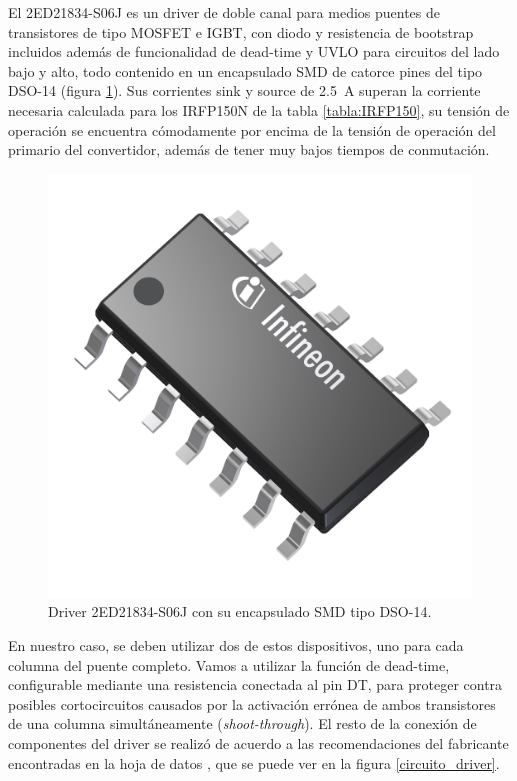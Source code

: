 El 2ED21834-S06J es un driver de doble canal para medios puentes de transistores de tipo MOSFET e IGBT, con diodo y resistencia de bootstrap incluidos además de funcionalidad de dead-time y UVLO para circuitos del lado bajo y alto, todo contenido en un encapsulado SMD de catorce pines del tipo DSO-14 (figura \ref{encapsulado_driver}). Sus corrientes sink y source de \SI[]{2.5}[]{\ampere} superan la corriente necesaria calculada para los IRFP150N de la tabla \ref{tabla:IRFP150}, su tensión de operación se encuentra cómodamente por encima de la tensión de operación del primario del convertidor, además de tener muy bajos tiempos de conmutación.\\

\begin{figure}[h]
    \centering
    \includegraphics[scale=0.07]{Imagenes/Driver DSO-14.png}
    \caption{Driver 2ED21834-S06J con su encapsulado SMD tipo DSO-14.}
    \label{encapsulado_driver}
\end{figure}

En nuestro caso, se deben utilizar dos de estos dispositivos, uno para cada columna del puente completo. Vamos a utilizar la función de dead-time, configurable mediante una resistencia conectada al pin DT, para proteger contra posibles cortocircuitos causados por la activación errónea de ambos transistores de una columna simultáneamente (\textit{shoot-through}). El resto de la conexión de componentes del driver se realizó de acuerdo a las recomendaciones del fabricante encontradas en la hoja de datos \cite{DatasheetDriver}, que se puede ver en la figura \ref{circuito_driver}.\\

